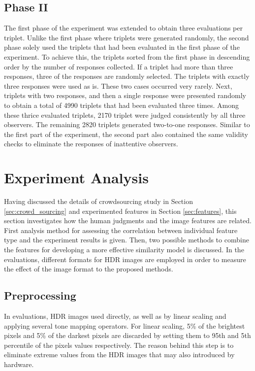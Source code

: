 \subsection{Phase II}
\label{sec:exp_phase_II}
The first phase of the experiment was extended to obtain three evaluations per triplet. Unlike the first phase where triplets were generated randomly, the second phase solely used the triplets that had been evaluated in the first phase of the experiment. To achieve this, the triplets sorted from the first phase in descending order by the number of responses collected. If a triplet had more than three responses, three of the responses are randomly selected. The triplets with exactly three responses were used as is. These two cases occurred very rarely. Next, triplets with two responses, and then a single response were presented randomly to obtain a total of 4990 triplets that had been evaluated three times. Among these thrice evaluated triplets, 2170 triplet were judged consistently by all three observers. The remaining 2820 triplets generated two-to-one responses. Similar to the first part of the experiment, the second part also contained the same validity checks to eliminate the responses of inattentive observers.

\section{Experiment Analysis}

Having discussed the details of crowdsourcing study in Section \ref{sec:crowd_sourcing} and experimented features in Section \ref{sec:features}, this section investigates how the human judgments and the image features are related. First analysis method for assessing the correlation between individual feature type and the experiment results is given. Then, two possible methods to combine the features for developing a more effective similarity model is discussed. In the evaluations, different formats for HDR images are employed in order to measure the effect of the image format to the proposed methods. 

\subsection{Preprocessing}
In evaluations, HDR images used directly, as well as by linear scaling and applying several tone mapping operators. For linear scaling, 5\% of the brightest pixels and 5\% of the darkest pixels are discarded by setting them to 95th and 5th percentile of the pixels values respectively. The reason behind this step is to eliminate extreme values from the HDR images that may also introduced by hardware. 


